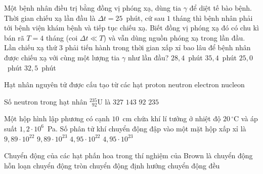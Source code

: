 	\begin{ex}%
		Một bệnh nhân điều trị bằng đồng vị phóng xạ, dùng tia $\gamma$ để diệt tế bào bệnh. Thời gian chiếu xạ lần đầu là $\Delta t=25$~phút, cứ sau $1$ tháng thì bệnh nhân phải tới bệnh viện khám bệnh và tiếp tục chiếu xạ. Biết đồng vị phóng xạ đó có chu kì bán rã $T=4$ tháng (coi $\Delta t\ll T$) và vẫn dùng nguồn phóng xạ trong lần đầu. Lần chiếu xạ thứ $3$ phải tiến hành trong thời gian xấp xỉ bao lâu để bệnh nhân được chiếu xạ với cùng một lượng tia $\gamma$ như lần đầu?
		\choice
		{$28{,}4$~phút}
		{\True $35{,}4$~phút}
		{$25{,}0$~phút}
		{$32{,}5$~phút}
	\end{ex}

	\begin{ex}%
		Hạt nhân nguyên tử được cấu tạo từ các hạt
		\choice
		{proton}
		{neutron}
		{electron}
		{\True nucleon}
	\end{ex}

	\begin{ex}%
		Số neutron trong hạt nhân $^{235}_{\phantom{2}92}\text{U}$ là
		\choice
		{$327$}
		{\True $143$}
		{$92$}
		{$235$}
	\end{ex}

	\begin{ex}%
		Một hộp hình lập phương có cạnh $10$~cm chứa khí lí tưởng ở nhiệt độ $20\,^\circ\text{C}$ và áp suất $1{,}2\cdot 10^6$~Pa. Số phân tử khí chuyển động đập vào một mặt hộp xấp xỉ là
		\choice
		{$9{,}89\cdot 10^{22}$}
		{$9{,}89\cdot 10^{23}$}
		{\True $4{,}95\cdot 10^{22}$}
		{$4{,}95\cdot 10^{23}$}
	\end{ex}

	\begin{ex}%
		Chuyển động của các hạt phấn hoa trong thí nghiệm của Brown là
		\choice
		{\True chuyển động hỗn loạn}
		{chuyển động tròn}
		{chuyển động định hướng}
		{chuyển động đều}
	\end{ex}

